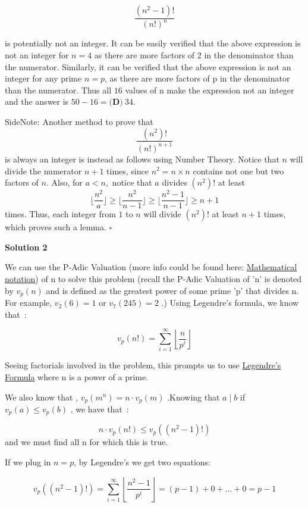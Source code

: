 \begin{enumerate}
 
 \[\frac{(n^2-1)!}{(n!)^{n}}\]

 is potentially not an integer. It can be easily verified that the above expression is not an integer for $n=4$ as there are more factors of $2$ in the denominator than the numerator. Similarly, it can be verified that the above expression is not an integer for any prime $n=p$, as there are more factors of p in the denominator than the numerator. Thus all $16$ values of n make the expression not an integer and the answer is $50-16=\boxed{\textbf{(D)}\ 34}$.

 SideNote: Another method to prove that 
 \[\frac{(n^2)!}{(n!)^{n+1}}\] is always an integer is instead as follows using Number Theory. Notice that $n$ will divide the numerator $n+1$ times, since $n^2 = n \times n$ contains not one but two factors of $n.$ Also, for $a < n,$ notice that $a$ divides $(n^2)!$ at least 
 \[\lfloor \frac{n^2}{a} \rfloor \ge \lfloor \frac{n^2}{n-1} \rfloor \ge \lfloor \frac{n^2 - 1}{n-1} \rfloor \ge n+1\] times. Thus, each integer from $1$ to $n$ will divide $(n^2)!$ at least $n+1$ times, which proves such a lemma. $\square{}$




\textbf{Solution 2}

We can use the P-Adic Valuation (more info could be found here: \href{https://artofproblemsolving.com/wiki/index.php?title=Mathematical\_notation}{Mathematical notation}) of n to solve this problem (recall the P-Adic Valuation of 'n' is denoted by $v_p (n)$ and is defined as the greatest power of some prime 'p' that divides n. For example, $v_2 (6)=1$ or $v_7 (245)=2$ .) Using Legendre's formula, we know that :

 
 \[v_p (n!)= \sum_{i=1}^\infty  \left\lfloor \frac {n}{p^i} \right\rfloor\]

 Seeing factorials involved in the problem, this prompts us to use \href{https://artofproblemsolving.com/wiki/index.php?title=Legendre\%27s\_Formula}{Legendre's Formula} where n is a power of a prime.

 We also know that , $v_p (m^n) = n \cdot v_p (m)$ .Knowing that $a\mid b$ if $v_p (a) \le v_p (b)$ , we have that :

 
 \[n \cdot v_p (n!) \le v_p ((n^2 -1 )!)\] and we must find all n for which this is true.

 If we plug in $n=p$, by Legendre's we get two equations:

 
 \[v_p ((n^2 -1)!) = \sum_{i=1}^\infty  \left\lfloor \frac {n^2 -1}{p^i} \right\rfloor = (p-1)+0+...+0 = p-1\]


\end{enumerate}
